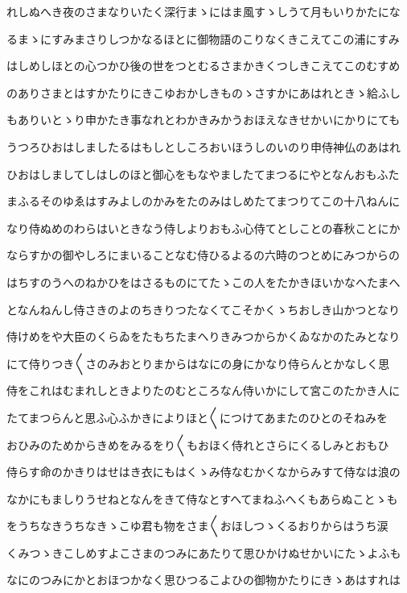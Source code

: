 \documentclass[a4paper,11pt,landscape]{ltjtarticle}
\begin{document}
れしぬへき夜のさまなりいたく深行まゝにはま風すゝしうて月もいりかたにな
\par\medskip
るまゝにすみまさりしつかなるほとに御物語のこりなくきこえてこの浦にすみ
\par\medskip
はしめしほとの心つかひ後の世をつとむるさまかきくつしきこえてこのむすめ
\par\medskip
のありさまとはすかたりにきこゆおかしきものゝさすかにあはれときゝ給ふし
\par\medskip
もありいとゝり申かたき事なれとわかきみかうおほえなきせかいにかりにても
\par\medskip
うつろひおはしましたるはもしとしころおいほうしのいのり申侍神仏のあはれ
\par\medskip
ひおはしましてしはしのほと御心をもなやましたてまつるにやとなんおもふた
\par\medskip
まふるそのゆゑはすみよしのかみをたのみはしめたてまつりてこの十八ねんに
\par\medskip
なり侍ぬめのわらはいときなう侍しよりおもふ心侍てとしことの春秋ことにか
\par\medskip
ならすかの御やしろにまいることなむ侍ひるよるの六時のつとめにみつからの
\par\medskip
はちすのうへのねかひをはさるものにてたゝこの人をたかきほいかなへたまへ
\par\medskip
となんねんし侍さきのよのちきりつたなくてこそかくゝちおしき山かつとなり
\par\medskip
侍けめをや大臣のくらゐをたもちたまへりきみつからかくゐなかのたみとなり
\par\medskip
にて侍りつき〱さのみおとりまからはなにの身にかなり侍らんとかなしく思
\par\medskip
侍をこれはむまれしときよりたのむところなん侍いかにして宮このたかき人に
\par\medskip
たてまつらんと思ふ心ふかきによりほと〱につけてあまたのひとのそねみを
\par\medskip
おひみのためからきめをみるをり〱もおほく侍れとさらにくるしみとおもひ
\par\medskip
侍らす命のかきりはせはき衣にもはくゝみ侍なむかくなからみすて侍なは浪の
\par\medskip
なかにもましりうせねとなんをきて侍なとすへてまねふへくもあらぬことゝも
\par\medskip
をうちなきうちなきゝこゆ君も物をさま〱おほしつゝくるおりからはうち涙
\par\medskip
くみつゝきこしめすよこさまのつみにあたりて思ひかけぬせかいにたゝよふも
\par\medskip
なにのつみにかとおほつかなく思ひつるこよひの御物かたりにきゝあはすれは
\end{document}
